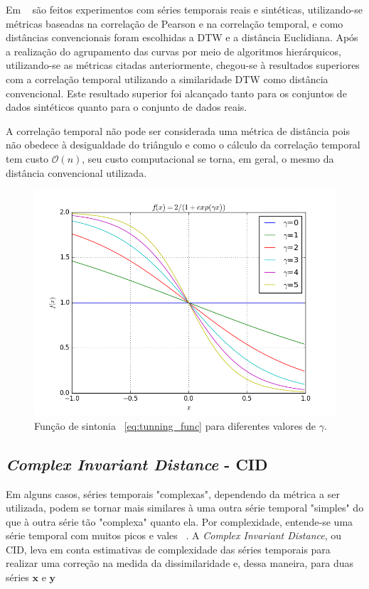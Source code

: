 Em ~\parencite{cort} são feitos experimentos com séries temporais reais e sintéticas, utilizando-se métricas baseadas na correlação de Pearson e na correlação temporal, e como distâncias convencionais foram escolhidas a DTW e a distância Euclidiana. Após a realização do agrupamento das curvas por meio de algoritmos hierárquicos, utilizando-se as métricas citadas anteriormente, chegou-se à resultados superiores com a correlação temporal utilizando a similaridade DTW como distância convencional. Este resultado superior foi alcançado tanto para os conjuntos de dados sintéticos quanto para o conjunto de dados reais.

A correlação temporal não pode ser considerada uma métrica de distância pois não obedece à desigualdade do triângulo e como o cálculo da correlação temporal tem custo $\mathcal{O}(n)$, seu custo computacional se torna, em geral, o mesmo da distância convencional utilizada. 

\begin{figure}[h!]
	\includegraphics[width=\linewidth]{figuras/tunning_cort.png}
	\caption{Função de sintonia ~\ref{eq:tunning_func} para diferentes valores de $\gamma$.}
	\label{fig:tunning_cort}
\end{figure}

\subsection{\emph{Complex Invariant Distance} - CID} \label{sec:CID}

Em alguns casos, séries temporais "complexas", dependendo da métrica a ser utilizada, podem se tornar mais similares à uma outra série temporal "simples"{} do que à outra série tão "complexa"{} quanto ela. Por complexidade, entende-se uma série temporal com muitos picos e vales ~\parencite{CID}. A \emph{Complex Invariant Distance}, ou CID, leva em conta estimativas de complexidade das séries temporais para realizar uma correção na medida da dissimilaridade e, dessa maneira, para duas séries $\bm{x}$ e $\bm{y}$

